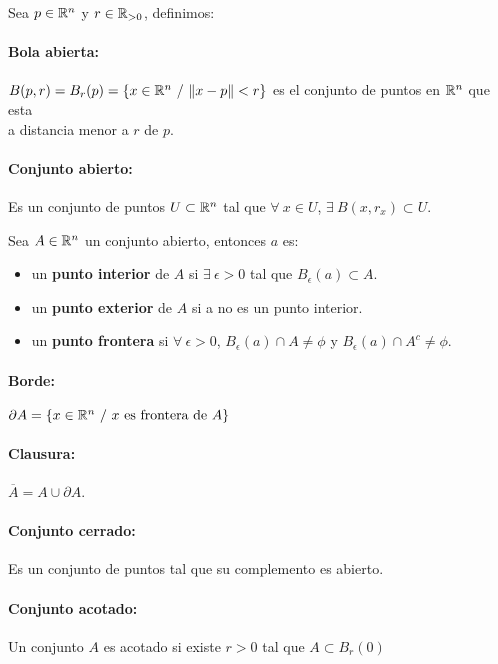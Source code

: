 Sea $p\in\mathbb{R}^n$ y $r\in\mathbb{R}_{>0}$, definimos:

\paragraph{Bola abierta:} $B(p,r) = B_r(p) = \{ x\in\mathbb{R}^n~/~\|x-p\| < r\}$ es el conjunto de puntos en $\mathbb{R}^n$ que esta \\ a distancia menor a $r$ de $p$.

\paragraph{Conjunto abierto:} Es un conjunto de puntos $U\subset\mathbb{R}^n$ tal que $\forall~x\in U$, $\exists~B(x,r_x)\subset U$.

Sea $A\in\mathbb{R}^n$ un conjunto abierto, entonces $a$ es:
\begin{itemize}
\item un \textbf{punto interior} de $A$ si $\exists~\epsilon>0$ tal que $B_\epsilon(a)\subset A$.
\item un \textbf{punto exterior} de $A$ si a no es un punto interior.
\item un \textbf{punto frontera} si $\forall~\epsilon>0$, $B_\epsilon(a)\cap A\neq\phi$ y $B_\epsilon(a)\cap A^c \neq\phi$.
\end{itemize}

\paragraph{Borde:} $\partial A = \{ x\in\mathbb{R}^n~/~x\text{ es frontera de } A\}$

\paragraph{Clausura:} $\overline{A} = A \cup\partial A $.

\paragraph{Conjunto cerrado: } Es un conjunto de puntos tal que su complemento es abierto.

\paragraph{Conjunto acotado:} Un conjunto $A$ es acotado si existe $r>0$ tal que $A\subset B_r(0)$

